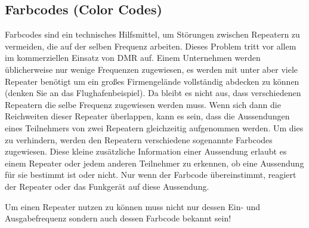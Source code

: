 \subsection{Farbcodes (Color Codes)} \label{sec:colorcode} 
Farbcodes sind ein technisches Hilfsmittel, um  Störungen zwischen Repeatern zu vermeiden, die auf der selben Frequenz arbeiten. Dieses Problem tritt vor allem im kommerziellen Einsatz von DMR auf. Einem Unternehmen werden üblicherweise nur wenige Frequenzen zugewiesen, es werden mit unter aber viele Repeater benötigt um ein großes Firmengelände vollständig abdecken zu können (denken Sie an das Flughafenbeispiel). Da bleibt es nicht aus, dass verschiedenen Repeatern die selbe Frequenz zugewiesen werden muss. Wenn sich dann die Reichweiten dieser Repeater überlappen, kann es sein, dass die Aussendungen eines Teilnehmers von zwei Repeatern gleichzeitig aufgenommen werden. Um dies zu verhindern, werden den Repeatern verschiedene sogenannte Farbcodes zugewiesen. Diese kleine zusätzliche Information einer Aussendung erlaubt es einem Repeater oder jedem anderen Teilnehmer zu erkennen, ob eine Aussendung für sie bestimmt ist oder nicht. Nur wenn der Farbcode übereinstimmt, reagiert der Repeater oder das Funkgerät auf diese Aussendung. 

\begin{merke}
 Um einen Repeater nutzen zu können muss nicht nur dessen Ein- und Ausgabefrequenz sondern auch dessen Farbcode bekannt sein!
\end{merke}